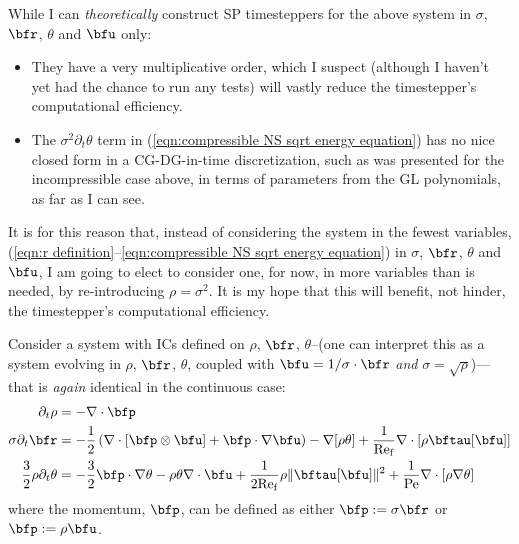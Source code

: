     \begin{remark}
        While I can \emph{theoretically} construct SP timesteppers for the above system in $\sigma$, $\bfr$, $\theta$ and $\bfu$ only:
        \begin{itemize}
            \item  They have a very multiplicative order, which I suspect (although I haven't yet had the chance to run any tests) will vastly reduce the timestepper's computational efficiency.
            \item  The $\sigma^{2}\partial_{t}\theta$ term in (\ref{eqn:compressible NS sqrt energy equation}) has no nice closed form in a CG-DG-in-time discretization, such as was presented for the incompressible case above, in terms of parameters from the GL polynomials, as far as I can see.
        \end{itemize}
        It is for this reason that, instead of considering the system in the fewest variables, (\ref{eqn:r definition}--\ref{eqn:compressible NS sqrt energy equation}) in $\sigma$, $\bfr$, $\theta$ and $\bfu$, I am going to elect to consider one, for now, in more variables than is needed, by re-introducing $\rho = \sigma^{2}$. It is my hope that this will benefit, not hinder, the timestepper's computational efficiency.
    \end{remark}

    Consider a system with ICs defined on $\rho$, $\bfr$, $\theta$--(one can interpret this as a system evolving in $\rho$, $\bfr$, $\theta$, coupled with $\bfu = 1/\sigma\cdot\bfr$ \emph{and} $\sigma = \sqrt{\rho}$)---that is \emph{again} identical in the continuous case:
    \begin{align}
                         \partial_{t}\rho  &=  - \nabla\cdot\bfp  \label{eqn:compressible NS final mass equation}  \\
                   \sigma\partial_{t}\bfr  &=  - \frac{1}{2}\left(\nabla\cdot\left[\bfp\otimes\bfu\right] + \bfp\cdot\nabla\bfu\right) - \nabla[\rho\theta] + \frac{1}{\rmRef}\nabla\cdot\left[\rho\bftau[\bfu]\right]  \\
        \frac{3}{2}\rho\partial_{t}\theta  &=  - \frac{3}{2}\bfp\cdot\nabla\theta - \rho\theta\nabla\cdot\bfu + \frac{1}{2\rmRef}\rho\|\bftau[\bfu]\|^{2} + \frac{1}{\rmPe}\nabla\cdot\left[\rho\nabla\theta\right]  \label{eqn:compressible NS final energy equation}
    \end{align}
    where the momentum, $\bfp$, can be defined as either $\bfp := \sigma\bfr$ or $\bfp := \rho\bfu$.


